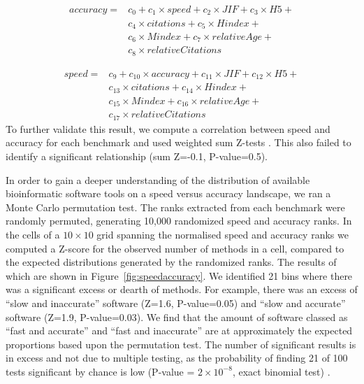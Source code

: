 \documentclass[fleqn,10pt]{SelfArx} %
\begin{document}
\begin{equation*}
\begin{split}
accuracy=& c_0+c_1\times speed+c_2\times JIF+c_3\times H5+\\
& c_4\times citations+c_5\times Hindex+\\
& c_6\times Mindex+c_7\times relativeAge+\\
& c_8\times relativeCitations
\end{split}
\end{equation*}

\begin{equation*}
\begin{split}
speed=& c_9+c_{10}\times accuracy+c_{11}\times JIF+c_{12}\times H5+\\
& c_{13}\times citations+c_{14}\times Hindex+\\
& c_{15}\times Mindex+c_{16}\times relativeAge+\\
& c_{17}\times relativeCitations
\end{split}
\end{equation*}
To further validate this result, we compute a correlation between speed and accuracy for each benchmark and used weighted sum Z-tests \cite{Zaykin2011-tj}. This also failed to identify a significant relationship (sum Z=-0.1, P-value=0.5).

In order to gain a deeper understanding of the distribution of available bioinformatic software tools on a speed versus accuracy landscape, we ran a Monte Carlo permutation test. The ranks extracted from each benchmark were randomly permuted, generating 10,000 randomized speed and accuracy ranks. In the cells of a $10\times10$ grid spanning the normalised speed and accuracy ranks we computed a Z-score for the observed number of methods in a cell, compared to the expected distributions generated by the randomized ranks. The results of which are shown in Figure~\ref{fig:speedaccuracy}. We identified 21 bins where there was a significant excess or dearth of methods. For example, there was an excess of “slow and inaccurate” software (Z=1.6, P-value=0.05) and “slow and accurate” software (Z=1.9, P-value=0.03). We find that the amount of software classed as “fast and accurate” and “fast and inaccurate” are at approximately the expected proportions based upon the permutation test. The number of significant results is in excess and not due to multiple testing, as the probability of finding 21 of 100 tests significant by chance is low (P-value = $2\times 10^{-8}$, exact binomial test) \cite{Moran2003-ve}.
\end{document}
